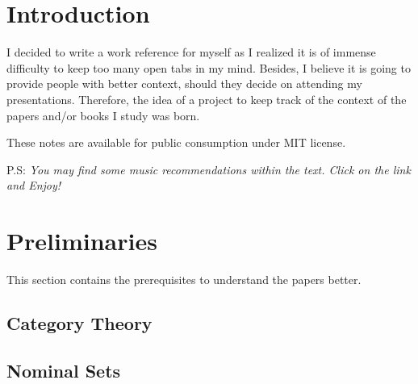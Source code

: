 \documentclass[12pt]{extarticle}
\begin{document}
\section{Introduction}
I decided to write a work reference for myself as I realized it is of immense difficulty to keep too many open tabs in my mind. Besides, I believe it is going to provide people with better context, should they decide on attending my presentations. Therefore, the idea of a project to keep track of the context of the papers and/or books I study was born.

These notes are available for public consumption under MIT license.

P.S: \emph{You may find some music recommendations within the text. Click on the link and Enjoy!}
    
\section{Preliminaries}
This section contains the prerequisites to understand the papers better.
\subsection{Category Theory}

\subsection{Nominal Sets}
\end{document}
